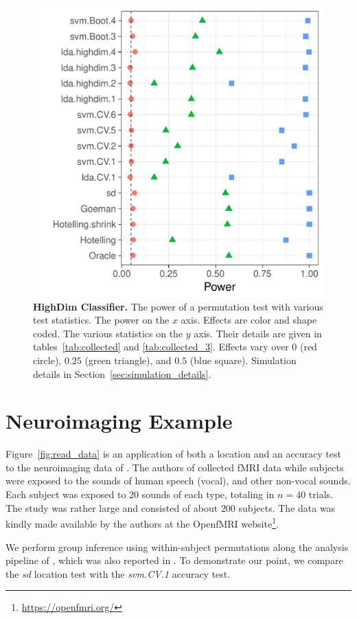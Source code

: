\documentclass[12pt,a4paper]{article}
\begin{document}
\begin{figure}[ht]
	\centering
	\includegraphics[width=0.5\linewidth]{"art/file14"}
	\caption{
		\textbf{HighDim Classifier.} 
		The power of a permutation test with various test statistics. 
		The power on the $x$ axis. 
		Effects are color and shape coded. 
		The various statistics on the $y$ axis. 
		Their details are given in tables~\ref{tab:collected} and \ref{tab:collected_3}. 
		Effects vary over $0$ (red circle), $0.25$ (green triangle), and $0.5$ (blue square). 
		Simulation details in Section~\ref{sec:simulation_details}.
	} 
	\label{fig:highdim}
\end{figure}








\section{Neuroimaging Example}
\label{sec:example}

Figure~\ref{fig:read_data} is an application of both a location and an accuracy test to the neuroimaging data of \cite{pernet_human_2015}. 
The authors of \cite{pernet_human_2015} collected fMRI data while subjects were exposed to the sounds of human speech (vocal), and other non-vocal sounds. 
Each subject was exposed to $20$ sounds of each type, totaling in $n=40$ trials.
The study was rather large and consisted of about $200$ subjects.
The data was kindly made available by the authors at the OpenfMRI website\footnote{\url{https://openfmri.org/}}.

We perform group inference using within-subject permutations along the analysis pipeline of \cite{stelzer_statistical_2013}, which was also reported in \cite{gilron_quantifying_2016}. 
To demonstrate our point, we compare the \emph{sd} location test with the \emph{svm.CV.1} accuracy test. 
\end{document}
